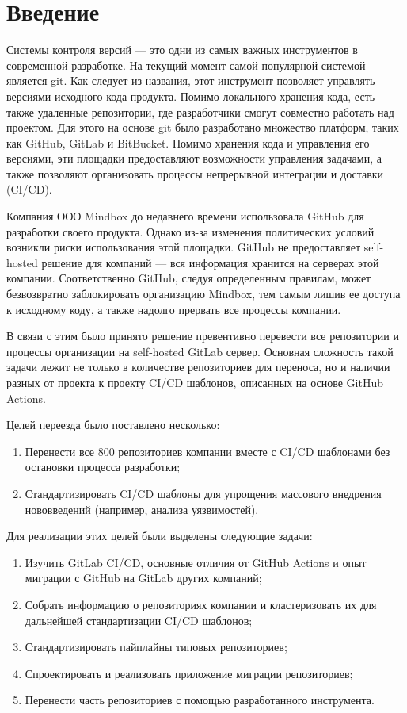 \chapter*{Введение}

Системы контроля версий — это одни из самых важных инструментов в современной разработке.
На текущий момент самой популярной системой является git.
Как следует из названия, этот инструмент позволяет управлять версиями исходного кода продукта.
Помимо локального хранения кода, есть также удаленные репозитории, где разработчики смогут совместно работать над проектом.
Для этого на основе git было разработано множество платформ, таких как GitHub, GitLab и BitBucket.
Помимо хранения кода и управления его версиями, эти площадки предоставляют возможности управления задачами,
а также позволяют организовать процессы непрерывной интеграции и доставки (CI/CD).

Компания ООО Mindbox до недавнего времени использовала GitHub для разработки своего продукта.
Однако из-за изменения политических условий возникли риски использования этой площадки.
GitHub не предоставляет self-hosted решение для компаний — вся информация хранится на серверах этой компании.
Соответственно GitHub, следуя определенным правилам, может безвозвратно заблокировать организацию Mindbox,
тем самым лишив ее доступа к исходному коду, а также надолго прервать все процессы компании.

В связи с этим было принято решение превентивно перевести все репозитории и процессы организации на self-hosted GitLab сервер.
Основная сложность такой задачи лежит не только в количестве репозиториев для переноса,
но и наличии разных от проекта к проекту CI/CD шаблонов, описанных на основе GitHub Actions.

Целей переезда было поставлено несколько:
\begin{enumerate}
  \item Перенести все 800 репозиториев компании вместе с CI/CD шаблонами без остановки процесса разработки;
  \item Стандартизировать CI/CD шаблоны для упрощения массового внедрения нововведений (например, анализа уязвимостей).
\end{enumerate}

Для реализации этих целей были выделены следующие задачи:
\begin{enumerate}
  \item Изучить GitLab CI/CD, основные отличия от GitHub Actions и опыт миграции с GitHub на GitLab других компаний;
  \item Собрать информацию о репозиториях компании и кластеризовать их для дальнейшей стандартизации CI/CD шаблонов;
  \item Стандартизировать пайплайны типовых репозиториев;
  \item Спроектировать и реализовать приложение миграции репозиториев;
  \item Перенести часть репозиториев с помощью разработанного инструмента.
\end{enumerate}
